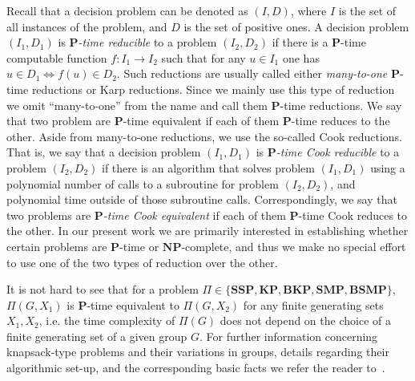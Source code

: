 \documentclass[10pt]{amsart}
\theoremstyle{definition}
\def\P{{\mathbf{P}}}
\def\NP{{\mathbf{NP}}}
\def\SSP{{\mathbf{SSP}}}
\def\SMP{{\mathbf{SMP}}}
\def\BSMP{{\mathbf{BSMP}}}
\def\BKP{{\mathbf{BKP}}}
\def\KP{{\mathbf{KP}}}
\begin{document}


\medskip
Recall that a decision problem can be denoted as $(I,D)$, where $I$ is the set of all instances of the problem, and $D$ is the set of positive ones. A decision problem $(I_1,D_1)$ is  {\em $\P$-time  reducible}
to  a problem $(I_2,D_2)$ if there is a $\P$-time computable function
$f:I_1  \to I_2$  such that for any $u \in I_1$ one has $u \in D_1 \Longleftrightarrow f(u) \in D_2$.
Such reductions are usually called either {\em many-to-one} $\P$-time reductions or Karp reductions.
Since we mainly use this type of reduction we omit ``many-to-one'' from the name and call them $\P$-time reductions. We say that two problem are $\P$-time equivalent if each of them $\P$-time reduces to the other. Aside from many-to-one reductions, we use the so-called Cook reductions. That is, we say that a decision problem $(I_1,D_1)$ is  {\em $\P$-time Cook  reducible} to  a problem $(I_2,D_2)$ if there is an algorithm that solves problem $(I_1,D_1)$ using a polynomial number of calls to a subroutine for problem $(I_2,D_2)$, and polynomial time outside of those subroutine calls. Correspondingly, we say that two problems are {\em $\P$-time Cook equivalent} if each of them $\P$-time Cook reduces to the other. In our present work we are primarily interested in establishing whether certain problems are $\P$-time or $\NP$-complete, and thus we make no special effort to use one of the two types of reduction over the other.

It is not hard to see that for a problem $\Pi\in \{\SSP, \KP, \BKP, \SMP, \BSMP\}$, $\Pi(G,X_1)$ is $\P$-time equivalent to $\Pi(G,X_2)$ for any finite generating sets $X_1,X_2$, i.e. the time complexity of $\Pi(G)$ does not depend on the choice of a finite generating set of a given group $G$.
For further information concerning knapsack-type problems and their variations in groups, details regarding their algorithmic set-up, and the corresponding basic facts we refer the reader to~\cite{Miasnikov-Nikolaev-Ushakov:2014a}.
\end{document}
